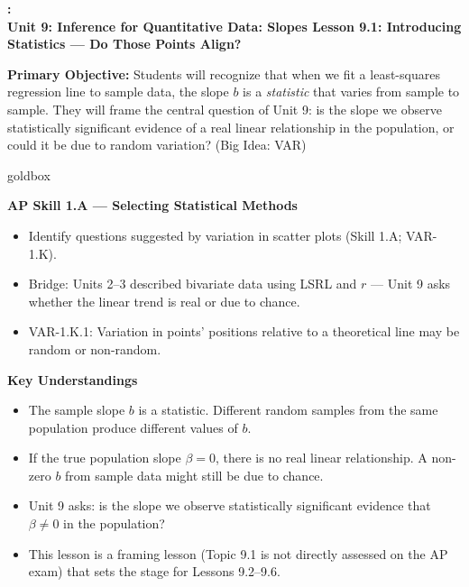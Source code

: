 \documentclass[10pt]{article}
\newcommand{\UnitNumberName}{Unit 9: Inference for Quantitative Data: Slopes \quad}
\newcommand{\LessonNumberName}{Lesson 9.1: Introducing Statistics --- Do Those Points Align?}
\begin{document}
\begin{center}
    {\Large\bfseries \CourseName: \SchoolYear \\
    {\small\bfseries \UnitNumberName \LessonNumberName}}
\end{center}

\begin{tcolorbox}[colback=sky, colframe=navy, boxrule=0.9pt, arc=2mm,
    left=2mm, right=2mm, top=1.5mm, bottom=1.5mm]
    \textbf{Primary Objective:} Students will recognize that when we fit a least-squares
    regression line to sample data, the slope $b$ is a \emph{statistic} that varies from
    sample to sample. They will frame the central question of Unit 9: is the slope we
    observe statistically significant evidence of a real linear relationship in the
    population, or could it be due to random variation?
    (Big Idea: VAR)
\end{tcolorbox}

\renewcommand{\arraystretch}{1.6}
\begin{skillbox}{goldbox}
\begin{minipage}[t]{0.48\linewidth}
    \textbf{AP Skill 1.A --- Selecting Statistical Methods}
    \begin{itemize}
        \item Identify questions suggested by variation in scatter plots (Skill 1.A; VAR-1.K).
        \item Bridge: Units 2--3 described bivariate data using LSRL and $r$ --- Unit 9
              asks whether the linear trend is real or due to chance.
        \item VAR-1.K.1: Variation in points' positions relative to a theoretical line
              may be random or non-random.
    \end{itemize}
\end{minipage}
\hfill
\begin{minipage}[t]{0.48\linewidth}
    \textbf{Key Understandings}
    \begin{itemize}
        \item The sample slope $b$ is a statistic. Different random samples from the
              same population produce different values of $b$.
        \item If the true population slope $\beta = 0$, there is no real linear relationship.
              A non-zero $b$ from sample data might still be due to chance.
        \item Unit 9 asks: is the slope we observe statistically significant evidence
              that $\beta \ne 0$ in the population?
        \item This lesson is a framing lesson (Topic 9.1 is not directly assessed on
              the AP exam) that sets the stage for Lessons 9.2--9.6.
    \end{itemize}
\end{minipage}
\end{skillbox}
\end{document}
